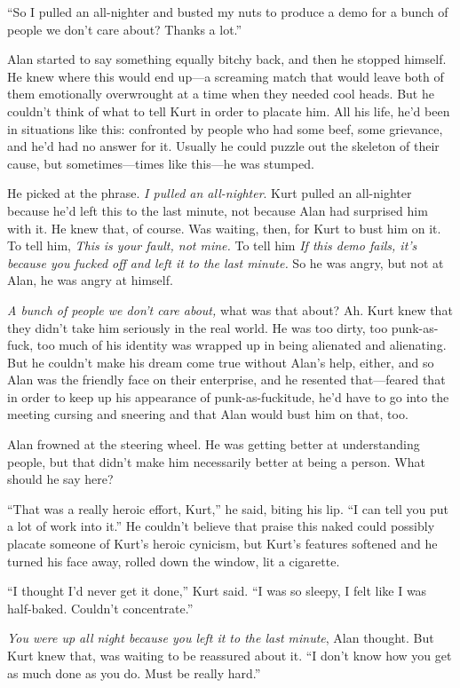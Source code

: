 \documentclass{article}
\begin{document}
``So I pulled an all-nighter and busted my nuts to produce a demo for
a bunch of people we don't care about?  Thanks a lot.''

Alan started to say something equally bitchy back, and then he stopped
himself.  He knew where this would end up---a screaming match that
would leave both of them emotionally overwrought at a time when they
needed cool heads.  But he couldn't think of what to tell Kurt in
order to placate him.  All his life, he'd been in situations like
this:  confronted by people who had some beef, some grievance, and
he'd had no answer for it.  Usually he could puzzle out the skeleton
of their cause, but sometimes---times like this---he was stumped.

He picked at the phrase.  \textit{I pulled an all-nighter}.  Kurt
pulled an all-nighter because he'd left this to the last minute, not
because Alan had surprised him with it.  He knew that, of course.  Was
waiting, then, for Kurt to bust him on it.  To tell him, \textit{This
is your fault, not mine.} To tell him \textit{If this demo fails, it's
because you fucked off and left it to the last minute.} So he was
angry, but not at Alan, he was angry at himself.

\textit{A bunch of people we don't care about,} what was that about? 
Ah.  Kurt knew that they didn't take him seriously in the real world. 
He was too dirty, too punk-as-fuck, too much of his identity was
wrapped up in being alienated and alienating.  But he couldn't make
his dream come true without Alan's help, either, and so Alan was the
friendly face on their enterprise, and he resented that---feared that
in order to keep up his appearance of punk-as-fuckitude, he'd have to
go into the meeting cursing and sneering and that Alan would bust him
on that, too.

Alan frowned at the steering wheel.  He was getting better at
understanding people, but that didn't make him necessarily better at
being a person.  What should he say here?

``That was a really heroic effort, Kurt,'' he said, biting his lip. 
``I can tell you put a lot of work into it.'' He couldn't believe that
praise this naked could possibly placate someone of Kurt's heroic
cynicism, but Kurt's features softened and he turned his face away,
rolled down the window, lit a cigarette.

``I thought I'd never get it done,'' Kurt said.  ``I was so sleepy, I
felt like I was half-baked.  Couldn't concentrate.''

\textit{You were up all night because you left it to the last minute},
Alan thought.  But Kurt knew that, was waiting to be reassured about
it.  ``I don't know how you get as much done as you do.  Must be
really hard.''
\end{document}
